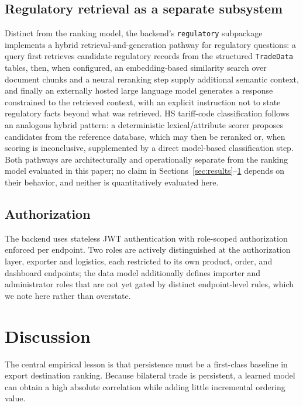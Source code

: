 \documentclass[conference]{IEEEtran}
\begin{document}
\subsection{Regulatory retrieval as a separate subsystem}

Distinct from the ranking model, the backend's \texttt{regulatory} subpackage implements a hybrid retrieval-and-generation pathway for regulatory questions: a query first retrieves candidate regulatory records from the structured \texttt{TradeData} tables, then, when configured, an embedding-based similarity search over document chunks and a neural reranking step supply additional semantic context, and finally an externally hosted large language model generates a response constrained to the retrieved context, with an explicit instruction not to state regulatory facts beyond what was retrieved. HS tariff-code classification follows an analogous hybrid pattern: a deterministic lexical/attribute scorer proposes candidates from the reference database, which may then be reranked or, when scoring is inconclusive, supplemented by a direct model-based classification step. Both pathways are architecturally and operationally separate from the ranking model evaluated in this paper; no claim in Sections~\ref{sec:results}--\ref{sec:results2} depends on their behavior, and neither is quantitatively evaluated here.

\subsection{Authorization}

The backend uses stateless JWT authentication with role-scoped authorization enforced per endpoint. Two roles are actively distinguished at the authorization layer, exporter and logistics, each restricted to its own product, order, and dashboard endpoints; the data model additionally defines importer and administrator roles that are not yet gated by distinct endpoint-level rules, which we note here rather than overstate.

\section{Discussion}
\label{sec:results2}

The central empirical lesson is that persistence must be a first-class baseline in export destination ranking. Because bilateral trade is persistent, a learned model can obtain a high absolute correlation while adding little incremental ordering value.
\end{document}
